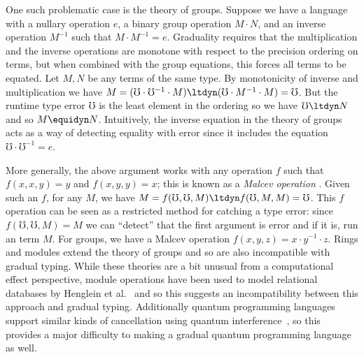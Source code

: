 \documentclass[acmsmall,screen,review,anonymous]{acmart}
\theoremstyle{remark}
\begin{document}
One such problematic case is the theory of groups. Suppose we have a language
with a nullary operation $e$, a binary group operation $M \cdot N$, and an
inverse operation $M^{-1}$ such that $M \cdot M^{-1} = e$. Graduality requires that the multiplication
and the inverse operations are monotone with respect to the precision ordering
on terms, but when combined with the group equations, this forces all terms to be equated.
%
Let $M, N$ be any terms of the same type. By monotonicity of inverse and
multiplication we have $M = (\mho \cdot \mho^{-1} \cdot M) \ltdyn
(\mho \cdot M^{-1} \cdot M) = \mho$. But the runtime type error $\mho$
is the least element in the ordering so we have $\mho \ltdyn N$ and so
$M \equidyn N$.
%
Intuitively, the inverse equation in the theory of groups acts as a
way of detecting equality with error since it includes the equation
$\mho \cdot \mho^{-1} = e$.

More generally, the above argument works with any operation $f$ such
that $f(x, x, y) = y$ and $f(x, y, y) = x$; this is known as a
\emph{Malcev operation} \cite{maltsev1963general}. Given such an $f$,
for any $M$, we have $M = f(\mho, \mho, M) \ltdyn f(\mho, M, M) =
\mho$. This $f$ operation can be seen as a restricted method for
catching a type error: since $f(\mho,\mho,M) = M$ we can ``detect''
that the first argument is error and if it is, run an term $M$. For
groups, we have a Malcev operation $f(x, y, z) = x \cdot y^{-1} \cdot z$.
%
Rings and modules extend the theory of groups and so are also
incompatible with gradual typing.
%
While these theories are a bit unusual from a computational effect
perspective, module operations have been used to model relational
databases by Henglein et al.~\cite{Henglein-Kaarsgaard-Mathiesen} and
so this suggests an incompatibility between this approach and gradual
typing. Additionally quantum programming languages support similar
kinds of cancellation using quantum interference~\cite{altenkirch-grattage2005,arrighi-dowek2017}, so this provides a
major difficulty to making a gradual quantum programming language as
well.


\end{document}
